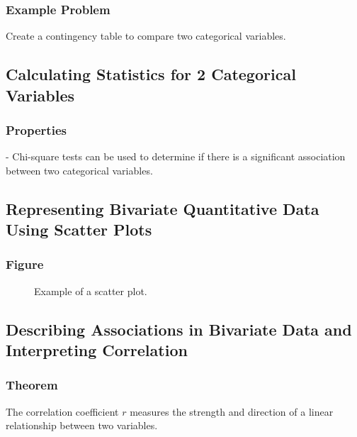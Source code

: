 \subsubsection{Example Problem}
\begin{example}
Create a contingency table to compare two categorical variables.
\end{example}

\subsection{Calculating Statistics for 2 Categorical Variables}
\subsubsection{Properties}
\begin{properties}
- Chi-square tests can be used to determine if there is a significant association between two categorical variables.
\end{properties}

\subsection{Representing Bivariate Quantitative Data Using Scatter Plots}
\subsubsection{Figure}
\begin{figure}[h!]
\centering
{}
\caption{Example of a scatter plot.}
\end{figure}

\subsection{Describing Associations in Bivariate Data and Interpreting Correlation}
\subsubsection{Theorem}
\begin{theorem}
The correlation coefficient \( r \) measures the strength and direction of a linear relationship between two variables.
\end{theorem}

